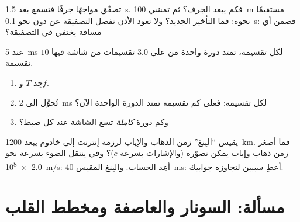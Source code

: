 \begin{exercise}[$\star\star\star$]\label{exo:g10:signals-and-waves:13}
تصفّق مواجهًا جرفًا فتسمع  بعد \qty{1.5}{s}. فكم يبعد
الجرف؟ ثم تمشي \qty{100}{m} مستقيمًا نحوه: فما التأخير الجديد؟ ولا
تعود الأذن تفصل التصفيقة عن  دون نحو \qty{0.1}{s}: فضمن أي
مسافة يختفي  في التصفيقة؟
\end{exercise}

\begin{exercise}[$\star\star\star$]\label{exo:g10:signals-and-waves:14}
عند \qty{5}{ms} لكل تقسيمة، تمتد دورة واحدة من  على $3.0$ تقسيمات
من شاشة فيها $10$ تقسيمة.
\begin{enumerate}
  \item جِد $T$ و$f$.
  \item تُحوَّل  إلى \qty{2}{ms} لكل تقسيمة: فعلى كم
        تقسيمة تمتد الدورة الواحدة الآن؟
  \item وكم دورة \emph{كاملة} تسع الشاشة عند كل
        ضبط؟
\end{enumerate}
\end{exercise}

\begin{exercise}[$\star\star\star$]\label{exo:g10:signals-and-waves:15}
يقيس ``البِنغ'' زمن الذهاب والإياب لرزمة إنترنت إلى
خادوم يبعد \qty{1200}{km}. فما أصغر زمن ذهاب وإياب يمكن
تصوّره (والإشارات بسرعة $c$)؟ وفي  ينتقل الضوء بسرعة نحو
\qty{2.0e8}{m/s}: أعِد الحساب. والبِنغ المقيس \qty{40}{ms}: أعطِ سببين
لتجاوزه جوابيك.
\end{exercise}

\section{مسألة: السونار والعاصفة ومخطط القلب}

